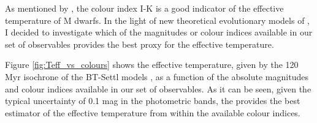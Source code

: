 As mentioned by \citet{1998A&A...333..231B}, the colour index I-K is a good indicator of the effective temperature of M dwarfs. In the light of new theoretical evolutionary models of \citet{2014IAUS..299..271A}, I decided to investigate which of the magnitudes or colour indices available in our set of observables provides the best proxy for the effective temperature. 

Figure \ref{fig:Teff_vs_colours} shows the effective temperature, given by the 120 Myr isochrone of the BT-Settl models \citep{2014IAUS..299..271A}, as a function of the absolute magnitudes and colour indices available in our set of observables. 
As it can be seen, given the typical uncertainty of 0.1 mag in the photometric bands, the  provides the best estimator of the effective temperature from within the available colour indices. 


